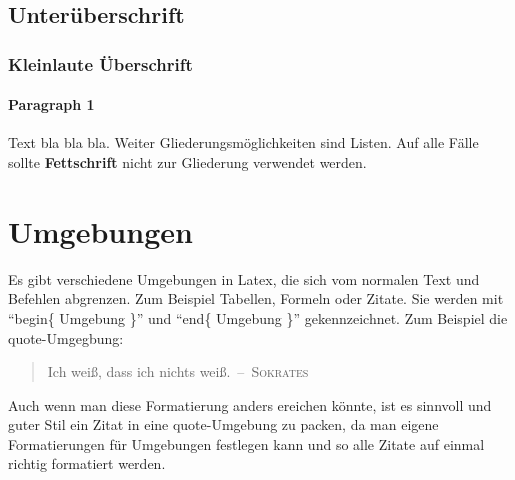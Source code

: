 	\subsection{Unterüberschrift}

		\subsubsection{Kleinlaute Überschrift}

			\paragraph{Paragraph 1}	%
			Text bla bla bla. Weiter Gliederungsmöglichkeiten sind Listen. Auf alle Fälle sollte \textbf{Fettschrift} nicht zur Gliederung verwendet werden.


\section{Umgebungen}
Es gibt verschiedene Umgebungen in Latex, die sich vom normalen Text und Befehlen abgrenzen.
Zum Beispiel Tabellen, Formeln oder Zitate. Sie werden mit ``begin\{ Umgebung \}'' und ``end\{ Umgebung \}'' gekennzeichnet.
Zum Beispiel die quote-Umgegbung:
\begin{quote}
	\glqq Ich weiß, dass ich nichts weiß.\grqq \ --\ \textsc{Sokrates}				%
\end{quote}
Auch wenn man diese Formatierung anders ereichen könnte,
ist es sinnvoll und guter Stil ein Zitat in eine quote-Umgebung zu packen,
da man eigene Formatierungen für Umgebungen festlegen kann und so alle Zitate auf einmal richtig formatiert werden.


